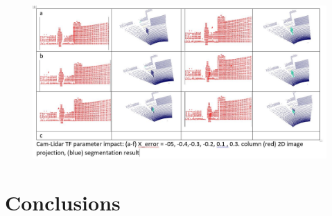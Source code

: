 \documentclass[journal]{IEEEtran}
\begin{document}
\begin{figure}[]
    \centering
    \includegraphics[width=0.5\columnwidth]{images/figure3.JPG}
    \caption{}
    \label{fig:framework}
\end{figure}   


\section{Conclusions}


\end{document}
